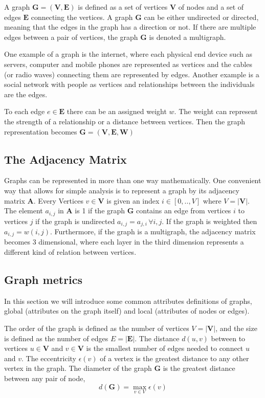 \newcommand{\graph}{\textbf{G}}
\newcommand{\vertices}{\textbf{V}}
\newcommand{\edges}{\textbf{E}}
\newcommand{\weights}{\textbf{W}}
\newcommand{\adjmat}{\textbf{A}}

A graph $\graph=(\vertices,\edges)$ is defined as a set of vertices $\vertices$ of nodes and a set of edges $\edges$ connecting the vertices. A graph $\graph$ can be either undirected or directed, meaning that the edges in the graph has a direction or not. If there are multiple edges between a pair of vertices, the graph $\graph$ is denoted a multigraph.

One example of a graph is the internet, where each physical end device such as servers, computer and mobile phones are represented as vertices and the cables (or radio waves) connecting them are represented by edges. Another example is a social network with people as vertices and relationships between the individuals are the edges.

To each edge $e\in\edges$ there can be an assigned weight $w$. The weight can represent the strength of a relationship or a distance between vertices. Then the graph representation becomes $\graph=(\vertices,\edges,\weights)$

\subsection{The Adjacency Matrix}
Graphs can be represented in more than one way mathematically. One convenient way that allows for simple analysis is to represent a graph by its adjacency matrix $\adjmat$. Every Vertices $v\in\vertices$ is given an index $i \in [0,..,V]$ where $V = |\vertices|$. The element $a_{i,j}$ in $\adjmat$ is 1 if the graph $\graph$ contains an edge from vertices $i$ to vertices $j$ if the graph is undirected $a_{i,j}=a_{j,i}\, \forall i,j$\cite{adj_matrix}. If the graph is weighted then $a_{i,j} = w(i,j)$. Furthermore, if the graph is a multigraph, the adjacency matrix becomes 3 dimensional, where each layer in the third dimension represents a different kind of relation between vertices.

\subsection{Graph metrics}
In this section we will introduce some common attributes definitions of graphs, global (attributes on the graph itself) and local (attributes of nodes or edges).

The order of the graph is defined as the number of vertices $V=|\vertices|$, and the size is defined as the number of edges $E=|\edges|$. The distance $d(u,v)$ between to vertices $u\in\vertices$ and $v\in\vertices$ is the smallest number of edges needed to connect $u$ and $v$. The eccentricity $\epsilon(v)$ of a vertex is the greatest distance to any other vertex in the graph. The diameter of the graph $\graph$ is the greatest distance between any pair of node\cite{graph_theory}, 
$$d(\textbf{G}) = \max_{v \in V}\epsilon(v)$$

